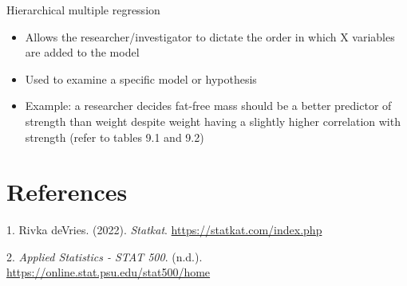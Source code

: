 \documentclass[
]{article}
\providecommand{\tightlist}{%
  \setlength{\itemsep}{0pt}\setlength{\parskip}{0pt}}
\newlength{\cslhangindent}
\newlength{\cslentryspacingunit} %
\newenvironment{CSLReferences}[2] %
 {%
  \setlength{\parindent}{0pt}
  \ifodd #1
  \let\oldpar\par
  \def\par{\hangindent=\cslhangindent\oldpar}
  \fi
  \setlength{\parskip}{#2\cslentryspacingunit}
 }%
 {}
\begin{document}
Hierarchical multiple regression

\begin{itemize}
\tightlist
\item
  Allows the researcher/investigator to dictate the order in which X variables are added to the model
\item
  Used to examine a specific model or hypothesis
\item
  Example: a researcher decides fat-free mass should be a better predictor of strength than weight despite weight having a slightly higher correlation with strength (refer to tables 9.1 and 9.2)
\end{itemize}

\hypertarget{references}{%
\section*{References}\label{references}}

\hypertarget{refs}{}
\begin{CSLReferences}{1}{0}
\leavevmode{}%
1. Rivka deVries. (2022). \emph{Statkat}. \url{https://statkat.com/index.php}

\leavevmode{}%
2. \emph{Applied Statistics - STAT 500}. (n.d.). \url{https://online.stat.psu.edu/stat500/home}

\end{CSLReferences}
\end{document}
